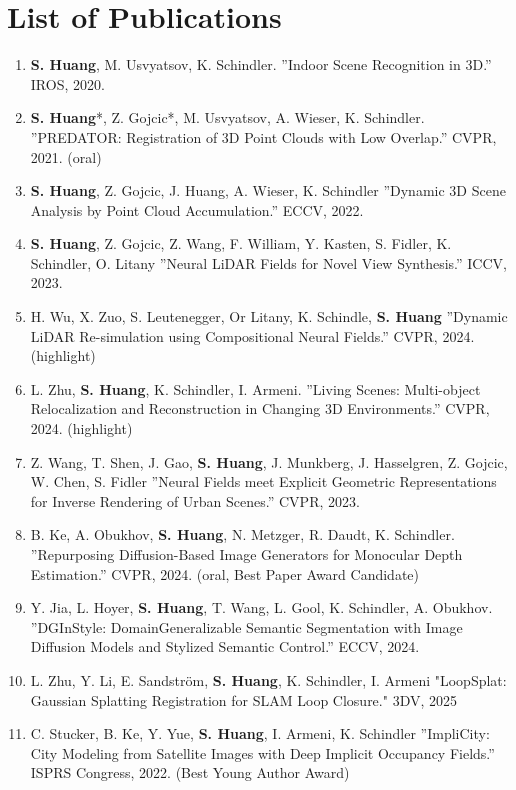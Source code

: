 
\chapter{List of Publications}
\label{chap:pub}

\begin{enumerate}
    \item \textbf{\textbf{S. Huang}}, M. Usvyatsov, K. Schindler. ”Indoor Scene Recognition in 3D.” IROS, 2020.
    \item \textbf{S. Huang}*, Z. Gojcic*, M. Usvyatsov, A. Wieser, K. Schindler. ”PREDATOR: Registration of 3D Point Clouds with Low Overlap.” CVPR, 2021. (oral)
    \item \textbf{S. Huang}, Z. Gojcic, J. Huang, A. Wieser, K. Schindler ”Dynamic 3D Scene Analysis by Point Cloud Accumulation.” ECCV, 2022.
    \item \textbf{S. Huang}, Z. Gojcic, Z. Wang, F. William, Y. Kasten, S. Fidler, K. Schindler, O. Litany ”Neural LiDAR Fields for Novel View Synthesis.” ICCV, 2023.
    \item H. Wu, X. Zuo, S. Leutenegger, Or Litany, K. Schindle, \textbf{S. Huang} ”Dynamic LiDAR Re-simulation using Compositional Neural Fields.” CVPR, 2024. (highlight)
    \item L. Zhu, \textbf{S. Huang}, K. Schindler, I. Armeni. ”Living Scenes: Multi-object Relocalization and Reconstruction in Changing 3D Environments.” CVPR, 2024. (highlight)
    \item Z. Wang, T. Shen, J. Gao, \textbf{S. Huang}, J. Munkberg, J. Hasselgren, Z. Gojcic, W. Chen, S. Fidler ”Neural Fields meet Explicit Geometric Representations for Inverse Rendering of Urban Scenes.” CVPR, 2023.
    \item B. Ke, A. Obukhov, \textbf{S. Huang}, N. Metzger, R. Daudt, K. Schindler. ”Repurposing Diﬀusion-Based Image Generators for Monocular Depth Estimation.” CVPR, 2024. (oral, Best Paper Award Candidate)
    \item Y. Jia, L. Hoyer, \textbf{S. Huang}, T. Wang, L. Gool, K. Schindler, A. Obukhov. ”DGInStyle: DomainGeneralizable Semantic Segmentation with Image Diﬀusion Models and Stylized Semantic Control.” ECCV, 2024.
    \item L. Zhu, Y. Li, E. Sandström, \textbf{S. Huang}, K. Schindler, I. Armeni "LoopSplat: Gaussian Splatting Registration for SLAM Loop Closure." 3DV, 2025
    \item C. Stucker, B. Ke, Y. Yue, \textbf{S. Huang}, I. Armeni, K. Schindler ”ImpliCity: City Modeling from Satellite Images with Deep Implicit Occupancy Fields.” ISPRS Congress, 2022. (Best Young Author Award)

\end{enumerate}
